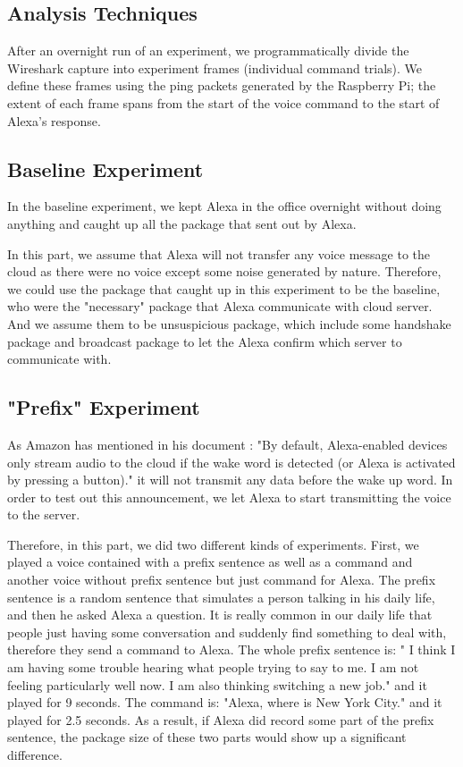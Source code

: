 \subsection{Analysis Techniques}

After an overnight run of an experiment, we programmatically divide the Wireshark capture into experiment frames (individual command trials). We define these frames using the ping packets generated by the Raspberry Pi; the extent of each frame spans from the start of the voice command to the start of Alexa's response. 

\subsection{Baseline Experiment}

In the baseline experiment, we kept Alexa in the office overnight without doing anything and caught up all the package that sent out by Alexa.

In this part, we assume that Alexa will not transfer any voice message to the cloud as there were no voice except some noise generated by nature. Therefore, we could use the package that caught up in this experiment to be the baseline, who were the "necessary" package that Alexa communicate with cloud server. And we assume them to be unsuspicious package, which include some handshake package and broadcast package to let the Alexa confirm which server to communicate with.

\subsection{"Prefix" Experiment}

As Amazon has mentioned in his document \todo{[1]}: "By default, Alexa-enabled devices only stream audio to the cloud if the wake word is detected (or Alexa is activated by pressing a button)." it will not transmit any data before the wake up word. In order to test out this announcement, we let Alexa to start transmitting the voice to the server. 

Therefore, in this part, we did two different kinds of experiments. First, we played a voice contained with a prefix sentence as well as a command and another voice without prefix sentence but just command for Alexa. The prefix sentence is a random sentence that simulates a person talking in his daily life, and then he asked Alexa a question. It is really common in our daily life that people just having some conversation and suddenly find something to deal with, therefore they send a command to Alexa. The whole prefix sentence is: " I think I am having some trouble hearing what people trying to say to me. I am not feeling particularly well now. I am also thinking switching a new job." and it played for 9 seconds. The command is: "Alexa, where is New York City." and it played for 2.5 seconds. As a result, if Alexa did record some part of the prefix sentence, the package size of these two parts would show up a significant difference.

